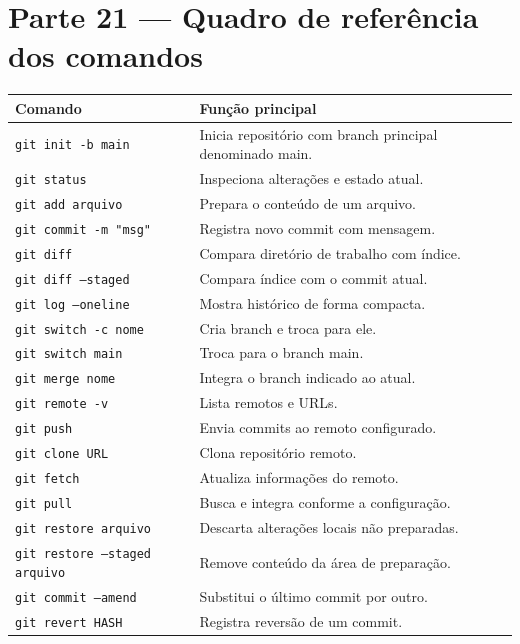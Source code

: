 \documentclass[11pt,a4paper]{article}
\renewcommand{\arraystretch}{1.18}
\begin{document}
\section*{Parte 21 --- Quadro de referência dos comandos}
\begin{center}\small
\renewcommand{\arraystretch}{1.3}
\begin{longtable}{|p{5.3cm}|p{8.2cm}|}\hline
\rowcolor{azulclaro}\textbf{Comando} & \textbf{Função principal} \\ \hline
\endhead
\texttt{git init -b main} & Inicia repositório com branch principal denominado main. \\ \hline
\texttt{git status} & Inspeciona alterações e estado atual. \\ \hline
\texttt{git add arquivo} & Prepara o conteúdo de um arquivo. \\ \hline
\texttt{git commit -m "msg"} & Registra novo commit com mensagem. \\ \hline
\texttt{git diff} & Compara diretório de trabalho com índice. \\ \hline
\texttt{git diff --staged} & Compara índice com o commit atual. \\ \hline
\texttt{git log --oneline} & Mostra histórico de forma compacta. \\ \hline
\texttt{git switch -c nome} & Cria branch e troca para ele. \\ \hline
\texttt{git switch main} & Troca para o branch main. \\ \hline
\texttt{git merge nome} & Integra o branch indicado ao atual. \\ \hline
\texttt{git remote -v} & Lista remotos e URLs. \\ \hline
\texttt{git push} & Envia commits ao remoto configurado. \\ \hline
\texttt{git clone URL} & Clona repositório remoto. \\ \hline
\texttt{git fetch} & Atualiza informações do remoto. \\ \hline
\texttt{git pull} & Busca e integra conforme a configuração. \\ \hline
\texttt{git restore arquivo} & Descarta alterações locais não preparadas. \\ \hline
\texttt{git restore --staged arquivo} & Remove conteúdo da área de preparação. \\ \hline
\texttt{git commit --amend} & Substitui o último commit por outro. \\ \hline
\texttt{git revert HASH} & Registra reversão de um commit. \\ \hline

\end{longtable}
\end{center}
\end{document}
